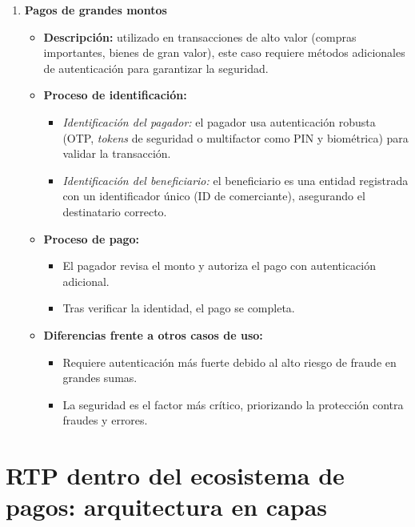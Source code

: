 \begin{enumerate}
    \item \textbf{Pagos de grandes montos}
    \begin{itemize}
        \item \textbf{Descripción:} utilizado en transacciones de alto valor (compras importantes, bienes de gran valor), este caso requiere métodos adicionales de autenticación para garantizar la seguridad.
        \item \textbf{Proceso de identificación:}
        \begin{itemize}
            \item \textit{Identificación del pagador:} el pagador usa autenticación robusta (OTP, \textit{tokens} de seguridad o multifactor como PIN y biométrica) para validar la transacción.
            \item \textit{Identificación del beneficiario:} el beneficiario es una entidad registrada con un identificador único (ID de comerciante), asegurando el destinatario correcto.
        \end{itemize}
        \item \textbf{Proceso de pago:}
        \begin{itemize}
            \item El pagador revisa el monto y autoriza el pago con autenticación adicional.
            \item Tras verificar la identidad, el pago se completa.
        \end{itemize}
        \item \textbf{Diferencias frente a otros casos de uso:}
        \begin{itemize}
            \item Requiere autenticación más fuerte debido al alto riesgo de fraude en grandes sumas.
            \item La seguridad es el factor más crítico, priorizando la protección contra fraudes y errores.
        \end{itemize}
    \end{itemize}
\end{enumerate}
\section{RTP dentro del ecosistema de pagos: arquitectura en capas}
\label{subsec:cubo-pagos}

